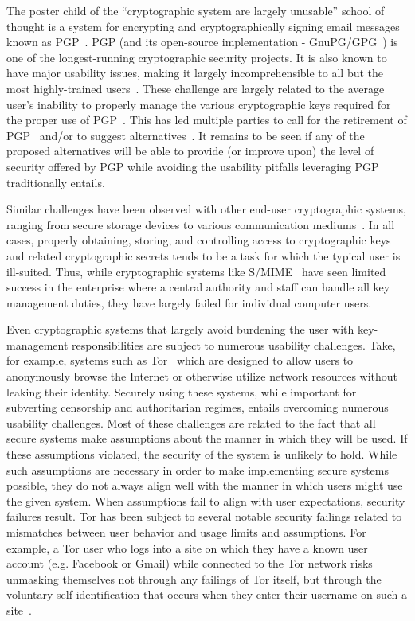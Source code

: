 The poster child of the ``cryptographic system are largely unusable''
school of thought is a system for encrypting and cryptographically
signing email messages known as PGP~\cite{callas2007}. PGP (and its
open-source implementation - GnuPG/GPG~\cite{gnupg}) is one of the
longest-running cryptographic security projects. It is also known to
have major usability issues, making it largely incomprehensible to all
but the most highly-trained users~\cite{whitten1999}. These challenge
are largely related to the average user's inability to properly manage
the various cryptographic keys required for the proper use of
PGP~\cite{green-challenge}. This has led multiple parties to call for
the retirement of PGP~\cite{green-pgp} and/or to suggest
alternatives~\cite{borisov2004, mailpile, openwhisper,
  google-endtoend}. It remains to be seen if any of the proposed
alternatives will be able to provide (or improve upon) the level of
security offered by PGP while avoiding the usability pitfalls
leveraging PGP traditionally entails.

Similar challenges have been observed with other end-user
cryptographic systems, ranging from secure storage devices to various
communication mediums~\cite{sweikata2009}. In all cases, properly
obtaining, storing, and controlling access to cryptographic keys and
related cryptographic secrets tends to be a task for which the typical
user is ill-suited. Thus, while cryptographic systems like
S/MIME~\cite{ramsdell-rfc5751} have seen limited success in the
enterprise where a central authority and staff can handle all key
management duties, they have largely failed for individual computer
users.

Even cryptographic systems that largely avoid burdening the user with
key-management responsibilities are subject to numerous usability
challenges. Take, for example, systems such as
Tor~\cite{dingledine2004} which are designed to allow users to
anonymously browse the Internet or otherwise utilize network resources
without leaking their identity. Securely using these systems, while
important for subverting censorship and authoritarian regimes, entails
overcoming numerous usability challenges. Most of these challenges are
related to the fact that all secure systems make assumptions about the
manner in which they will be used. If these assumptions violated, the
security of the system is unlikely to hold. While such assumptions are
necessary in order to make implementing secure systems possible, they
do not always align well with the manner in which users might use the
given system. When assumptions fail to align with user expectations,
security failures result. Tor has been subject to several notable
security failings related to mismatches between user behavior and
usage limits and assumptions. For example, a Tor user who logs into a
site on which they have a known user account (e.g. Facebook or Gmail)
while connected to the Tor network risks unmasking themselves not
through any failings of Tor itself, but through the voluntary
self-identification that occurs when they enter their username on such
a site~\cite{goodin-dreadpirate}.


